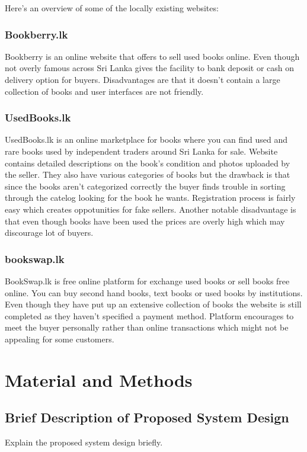 \documentclass{article}
\begin{document}
Here's an overview of some of the locally existing websites:

\subsubsection{Bookberry.lk}
Bookberry is an online website that offers to sell used books online. Even though not overly famous across Sri Lanka gives the facility to bank deposit or cash on delivery option for buyers. Disadvantages are that it doesn't contain a large collection of books and user interfaces are not friendly. 

\subsubsection{UsedBooks.lk}
UsedBooks.lk is an online marketplace for books where you can find used and rare books used by independent traders around Sri Lanka for sale.
Website contains detailed descriptions on the book's condition and photos uploaded by the seller. They also have various categories of books but the drawback is that since the books aren't categorized correctly the buyer finds trouble in sorting through the catelog looking for the book he wants. Registration process is fairly easy which creates oppotunities for fake sellers. Another notable disadvantage is that even though books have been used the prices are overly high which may discourage lot of buyers. 

\subsubsection{bookswap.lk}
BookSwap.lk is free online platform for exchange used books or sell books free online. You can buy second hand books, text books or used books by institutions. Even though they have put up an extensive collection of books the website is still completed as they haven't specified a payment method. Platform encourages to meet the buyer personally rather than online transactions which might not be appealing for some customers. 

\newpage
\section{Material and Methods}
\subsection{Brief Description of Proposed System Design}
Explain the proposed system design briefly.
\end{document}
